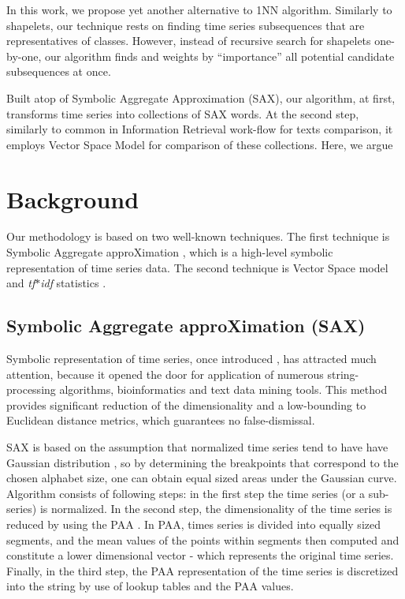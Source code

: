 \documentclass{llncs}
\begin{document}
In this work, we propose yet another alternative to 1NN algorithm. Similarly to shapelets, our
technique rests on finding time series subsequences that are representatives of classes. However,
instead of recursive search for shapelets one-by-one, our algorithm finds and weights by
``importance'' all potential candidate subsequences at once. 

Built atop of Symbolic Aggregate Approximation (SAX), our algorithm, at first, transforms time
series into collections of SAX words. At the second step, similarly to common in Information
Retrieval work-flow for texts comparison, it employs Vector Space Model for comparison
of these collections. Here, we argue 

\section{Background}
Our methodology is based on two well-known techniques. The first technique is Symbolic Aggregate
approXimation \cite{sax}, which is a high-level symbolic representation of time series
data. The second technique is Vector Space model and \textit{tf$\ast$idf} statistics
\cite{salton}.

\subsection{Symbolic Aggregate approXimation (SAX)}
Symbolic representation of time series, once introduced \cite{sax}, has attracted much attention,
because it opened the door for application of numerous string-processing algorithms, bioinformatics
and text data mining tools. This method provides significant reduction of the dimensionality and
a low-bounding to Euclidean distance metrics, which guarantees no false-dismissal.

SAX is based on the assumption that normalized time series tend to have have Gaussian distribution
\cite{larsen_marx}, so by determining the breakpoints that correspond to the chosen alphabet
size, one can obtain equal sized areas under the Gaussian curve. Algorithm consists of following
steps: in the first step the time series (or a sub-series) is normalized. In the second step, the
dimensionality of the time series is reduced by using the PAA \cite{paa}. In PAA, times series is
divided into equally sized segments, and the mean values of the points within segments then computed
and constitute a lower dimensional vector - which represents the original time series. Finally, in
the third step, the PAA representation of the time series is discretized into the string by use of
lookup tables and the PAA values.
\end{document}
